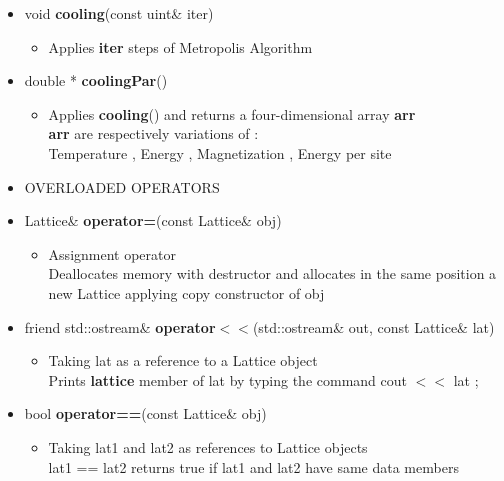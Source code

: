 \documentclass[11pt,a4paper]{article}
\begin{document}
\begin{itemize}
\begin{itemize}
			
			\item[] void \textbf{cooling}(const uint\& iter) 		 
			\begin{itemize}
				\item[] Applies \textbf{iter} steps of Metropolis Algorithm
			\end{itemize}
			
			\item[] double * \textbf{coolingPar}()	 
			\begin{itemize}
				\item[] Applies \textbf{cooling}() and returns a four-dimensional array \textbf{arr} \\
						\textbf{arr} are respectively variations of : \\
						Temperature , Energy , Magnetization , Energy per site  \\
			\end{itemize}
		
		\item[] 
		OVERLOADED OPERATORS \\

			\item[] Lattice\& \textbf{operator=}(const Lattice\& obj)		 
			\begin{itemize}
				\item[] Assignment operator \\
						Deallocates memory with destructor  
						and allocates in the same position a new Lattice applying copy constructor of obj 				\end{itemize}
			
			\item[] friend std::ostream\& \textbf{operator$<<$}(std::ostream\& out, const Lattice\& lat) 	
			\begin{itemize}
				\item[] Taking \textsf{lat} as a reference to a Lattice object \\
				Prints \textbf{lattice} member of \textsf{lat} by typing the command \textsf{cout $<<$ lat ;} 
			\end{itemize}	
			
			\item[] bool \textbf{operator==}(const Lattice\& obj) 		 
			\begin{itemize}
				\item[] Taking \textsf{lat1} and \textsf{lat2} as references to Lattice objects \\
						\textsf{lat1 == lat2} returns true if \textsf{lat1} and \textsf{lat2} have same data members
			\end{itemize}
			

\end{itemize}
\end{itemize}
\end{document}
